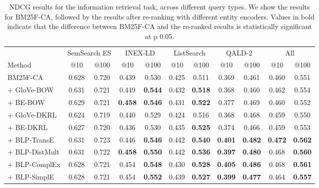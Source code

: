 \documentclass[sigconf]{acmart}
\let\mc\multicolumn
\begin{document}
\begin{table*}
\caption{NDCG results for the information retrieval task, across different query types. We show the results for BM25F-CA, followed by the results after re-ranking with different entity encoders. Values in bold indicate that the difference between BM25F-CA and the re-ranked results is statistically significant at p  0.05.}
\label{tab:results-retrieval}
\centering
\begin{tabular}{lcccccccccc}
\toprule
                & \mc{2}{c}{SemSearch ES} & \mc{2}{c}{INEX-LD}    & \mc{2}{c}{ListSearch}  &  \mc{2}{c}{QALD-2}    &  \mc{2}{c}{All}       \\
Method          &      @10     &     @100 &    @10    &     @100  &     @10    &     @100  &    @10    &     @100  &    @10    &     @100  \\ 
\midrule                                                                                                                    
BM25F-CA        &      0.628   &    0.720 &    0.439  &    0.530  &     0.425  &    0.511  &    0.369  &    0.461  &    0.460  &    0.551  \\
\midrule
+ GloVe-BOW     &      0.631   &    0.721 &    0.449  &\bf 0.544  &     0.432  &\bf 0.518  &    0.368  &    0.460  &    0.462  &    0.554  \\
+ BE-BOW        &      0.629   &    0.721 &\bf 0.458  &\bf 0.546  &     0.431  &\bf 0.522  &    0.377  &    0.469  &    0.460  &    0.552  \\
+ GloVe-DKRL    &      0.624   &    0.719 &    0.440  &    0.529  &     0.424  &    0.516  &    0.368  &    0.468  &    0.459  &    0.550  \\
+ BE-DKRL       &      0.627   &    0.720 &    0.436  &    0.530  &     0.435  &\bf 0.525  &    0.374  &    0.466  &    0.459  &    0.553  \\
\midrule
+ BLP-TransE   &      0.631   &    0.723 &    0.446  &\bf 0.546  &     0.442  &\bf 0.540  &\bf 0.401  &\bf 0.482  &\bf 0.472  &\bf 0.562  \\
+ BLP-DistMult &      0.631   &    0.722 &\bf 0.458  &\bf 0.550  &     0.442  &\bf 0.536  &\bf 0.397  &\bf 0.480  &    0.468  &\bf 0.560  \\                                                                                         
+ BLP-ComplEx  &      0.628   &    0.721 &    0.454  &\bf 0.548  &     0.430  &\bf 0.528  &\bf 0.405  &\bf 0.486  &    0.468  &\bf 0.561  \\
+ BLP-SimplE   &      0.628   &    0.721 &    0.454  &\bf 0.552  &     0.439  &\bf 0.527  &\bf 0.399  &\bf 0.477  &    0.464  &\bf 0.557  \\
\bottomrule
\end{tabular}
\end{table*}
\end{document}
